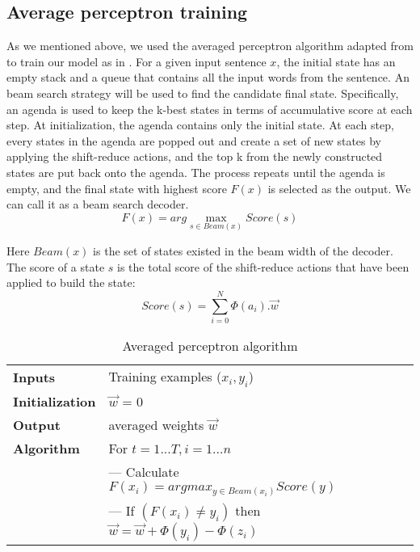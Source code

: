 \subsection{Average perceptron training}
As we mentioned above, we used the averaged perceptron algorithm adapted from \cite{ref:2004Collins} to train our model as in \cite{ref:2012Zhu}. For a given input sentence $x$, the initial state has an empty stack and a queue that contains all the input words from the sentence. An beam search strategy will be used to find the candidate final state. Specifically, an agenda is used to keep the k-best states in terms of accumulative score at each step. At initialization, the agenda contains only the initial state. At each step, every states in the agenda are popped out and create a set of new states by applying the shift-reduce actions, and the top k from the newly constructed states are put back onto the agenda. The process repeats until the agenda is empty, and the final state with highest score $F(x)$ is selected as the output. We can call it as a beam search decoder.
\begin{equation}
	F(x) = arg\max_{s \in Beam(x)} Score(s)
\end{equation}

Here $Beam(x)$ is the set of states existed in the beam width of the decoder. The score of a state $s$ is the total score of the shift-reduce actions that have been applied to build the state:
\begin{equation}
	Score(s) = \sum_{i = 0}^{N} \Phi(a_i).\vec{w}
\end{equation}

\begin{table*}[t]
	\begin{center}
		\caption{\label{perceptron} Averaged perceptron algorithm}
		
		\begin{tabular}{|l|l|}
			\hline
			\bf Inputs & Training examples ($x_i,y_i$) \\
			\bf Initialization & $\vec{w}$ = 0 \\
			\bf Output & averaged weights $\vec{w}$ \\
			\hline
			\bf Algorithm 	& For $t = 1 ...T, i = 1 ...n$ \\
			& --- Calculate $F(x_i) = argmax_{y \in Beam(x_i)}Score(y)$ \\
			& --- If $(F(x_i) \neq y_i)$ then $\vec{w} = \vec{w} + \Phi(y_i) - \Phi(z_i)$ \\
			\hline							
		\end{tabular}
	\end{center}
\end{table*}

